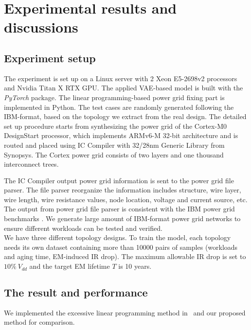 \section{Experimental results and discussions}
\label{sec:results}
\subsection{Experiment setup}
The experiment is set up on a Linux server with 2 Xeon E5-2698v2
processors and Nvidia Titan X RTX GPU. The applied VAE-based model is built with the {\it PyTorch} package. The linear
programming-based power grid fixing part is implemented in Python. The
test cases are randomly generated following the IBM-format, based on
the topology we extract from the real design. The detailed set up procedure
starts from synthesizing the power grid of the Cortex-M0 DesignStart 
processor, which implements ARMv6-M 32-bit architecture and is routed and placed
using IC Compiler with 32/28nm Generic Library from Synopsys. The Cortex power grid
consists of two layers and one thousand interconnect trees.

The IC Compiler output power grid information is sent to the power grid file parser.
The file parser reorganize the information includes structure, wire layer, wire length, 
wire resistance values, node location, voltage and current source, etc. The output from power grid
file parser is consistent with the IBM power grid benchmarks \cite{Nassif:ASPDAC'08}. We generate 
large amount of IBM-format power grid networks to ensure different workloads can be tested and verified.\\

We have three different topology designs. To train the model, each topology needs its own dataset containing more than 10000 pairs of samples  (workloads and aging time, EM-induced IR drop). The maximum allowable IR drop is set to $10\% \ V_{dd}$ and the target EM lifetime $T$ is 10 years. 







\subsection{The result and performance}
We implemented the excessive linear programming method in~\cite{Sukharev:2019pg} and our proposed method for comparison. 

